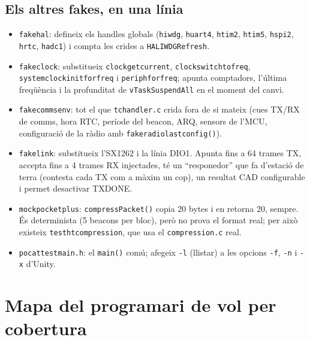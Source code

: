\documentclass[11pt,a4paper]{article}
\DeclareRobustCommand{\_}{\textunderscore\allowbreak}
\newcommand{\cd}[1]{\texttt{#1}}
\begin{document}
\subsection{Els altres fakes, en una línia}
\begin{itemize}
\item \cd{fake\_hal}: defineix els handles globals (\cd{hiwdg}, \cd{huart4}, \cd{htim2}, \cd{htim5},
  \cd{hspi2}, \cd{hrtc}, \cd{hadc1}) i compta les crides a \cd{HAL\_IWDG\_Refresh}.
\item \cd{fake\_clock}: substitueix \cd{clock\_get\_current}, \cd{clock\_switch\_to\_freq},
  \cd{systemclock\_init\_for\_freq} i \cd{periph\_*\_for\_freq}; apunta comptadors, l'última
  freqüència i la profunditat de \cd{vTaskSuspendAll} en el moment del canvi.
\item \cd{fake\_comms\_env}: tot el que \cd{tc\_handler.c} crida fora de si mateix (cues TX/RX de
  comms, hora RTC, període del beacon, ARQ, sensors de l'MCU, configuració de la ràdio amb
  \cd{fake\_radio\_last\_config()}).
\item \cd{fake\_link}: substitueix l'SX1262 i la línia DIO1. Apunta fins a 64 trames TX, accepta fins
  a 4 trames RX injectades, té un ``responedor'' que fa d'estació de terra (contesta cada TX com a
  màxim un cop), un resultat CAD configurable i permet desactivar TX\_DONE.
\item \cd{mock\_pocket\_plus}: \cd{compressPacket()} copia 20 bytes i en retorna 20, sempre. És
  determinista (5 beacons per bloc), però no prova el format real; per això existeix
  \cd{test\_ht\_compression}, que usa el \cd{compression.c} real.
\item \cd{pocat\_test\_main.h}: el \cd{main()} comú; afegeix \cd{-l} (llistar) a les opcions
  \cd{-f}, \cd{-n} i \cd{-x} d'Unity.
\end{itemize}

\section{Mapa del programari de vol per cobertura}\label{sec:coverage}
\end{document}
